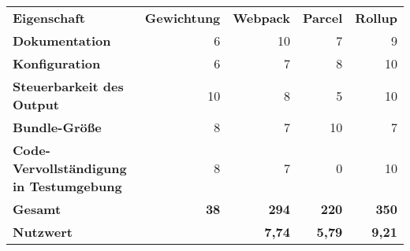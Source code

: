 \begin{tabular}{lrrrr}
\rowcolor{heading}\textbf{Eigenschaft} & \textbf{Gewichtung} 	& \textbf{Webpack} 	& \textbf{Parcel} 	& \textbf{Rollup} 	\\
\textbf{Dokumentation} & 6     & 10    & 7     & 9 \\
\rowcolor{odd}\textbf{Konfiguration} & 6     & 7     & 8     & 10 \\
\textbf{Steuerbarkeit des Output} & 10    & 8     & 5     & 10 \\
\rowcolor{odd}\textbf{Bundle-Größe} & 8     & 7     & 10    & 7 \\
\textbf{Code-Vervollständigung in Testumgebung} & 8     & 7     & 0     & 10 \\
\rowcolor{heading}\textbf{Gesamt} & \textbf{38} & \textbf{294} & \textbf{220} & \textbf{350} \\
\rowcolor{odd}\textbf{Nutzwert} &       & \textbf{7,74} & \textbf{5,79} & \textbf{9,21} \\
\end{tabular}%

  